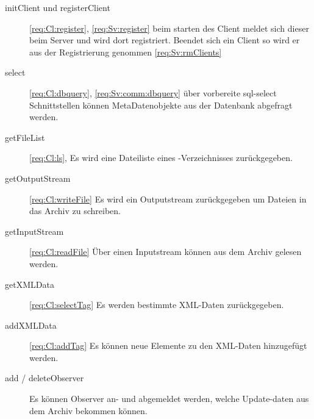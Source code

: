 \begin{description}
	\item [initClient und registerClient]
		\ref{req:Cl:register}, \ref{req:Sv:register}
		beim starten des Client meldet sich dieser beim Server und wird dort registriert.
		Beendet sich ein Client so wird er aus der Registrierung genommen \ref{req:Sv:rmClients}
	\item [select]
		\ref{req:Cl:dbquery}, \ref{req:Sv:comm:dbquery}
		über vorbereite sql-select Schnittstellen können MetaDatenobjekte aus der
		Datenbank abgefragt werden.
	\item [getFileList]
		\ref{req:Cl:ls}, 
		Es wird eine Dateiliste eines \arc-Verzeichnisses zurückgegeben.
	\item [getOutputStream]
		\ref{req:Cl:writeFile}
		Es wird ein Outputstream zurückgegeben um Dateien in das Archiv zu schreiben.
	\item [getInputStream]
		\ref{req:Cl:readFile}
		Über einen Inputstream können aus dem Archiv gelesen werden.
	\item [getXMLData]
		\ref{req:Cl:selectTag}
		Es werden bestimmte XML-Daten zurückgegeben.
	\item [addXMLData]
		\ref{req:Cl:addTag}
		Es können neue Elemente zu den XML-Daten hinzugefügt werden.
	\item [add / deleteObserver]
		Es können Observer an- und abgemeldet werden, welche Update-daten aus dem
		Archiv bekommen können.
\end{description}
